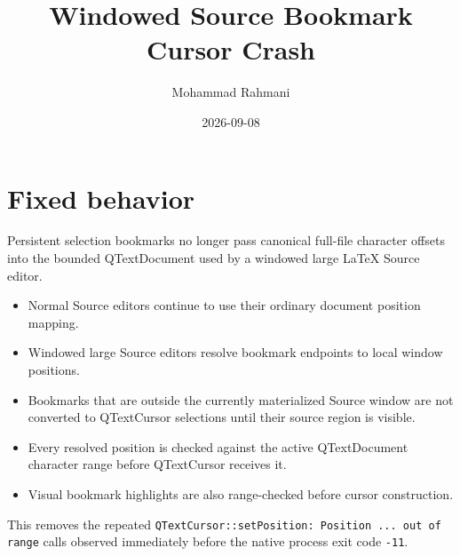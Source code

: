 \documentclass[a4paper]{article}
\title{Windowed Source Bookmark Cursor Crash}
\date{2026-09-08}
\author{Mohammad Rahmani}
\begin{document}
   \maketitle

   \section{Fixed behavior}

   Persistent selection bookmarks no longer pass canonical full-file character
   offsets into the bounded QTextDocument used by a windowed large LaTeX
   Source editor.

   \begin{itemize}
      \item Normal Source editors continue to use their ordinary document
      position mapping.
      \item Windowed large Source editors resolve bookmark endpoints to local
      window positions.
      \item Bookmarks that are outside the currently materialized Source window
      are not converted to QTextCursor selections until their source region is
      visible.
      \item Every resolved position is checked against the active
      QTextDocument character range before QTextCursor receives it.
      \item Visual bookmark highlights are also range-checked before cursor
      construction.
   \end{itemize}

   This removes the repeated
   \verb|QTextCursor::setPosition: Position ... out of range| calls observed
   immediately before the native process exit code \verb|-11|.

   
   
\end{document}
